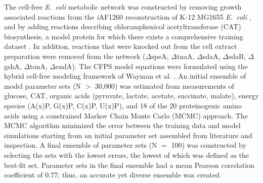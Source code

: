\documentclass[12pt]{article}
\begin{document}
The cell-free \textit{E.~coli} metabolic network was constructed by removing growth associated reactions from the \textit{i}AF1260 reconstruction of K-12 MG1655 \textit{E.~coli} \cite{Feist:2007aa}, and by adding reactions describing chloramphenicol acetyltransferase (CAT) biosynthesis, a model protein for which there exists a comprehensive training dataset \cite{2005_calhoun_BiotechnologyProgress}.
In addition, reactions that were knocked out from the cell extract preparation were removed from the network ($\Delta$speA, $\Delta$tnaA, $\Delta$sdaA, $\Delta$sdaB, $\Delta$gshA, $\Delta$tonA, $\Delta$endA).
The CFPS model equations were formulated using the hybrid cell-free modeling framework of Wayman et al. \cite{pr3010138}.
An initial ensemble of model parameter sets (N $>$ 30,000) was estimated from measurements of glucose, CAT, organic acids (pyruvate, lactate, acetate, succinate, malate), energy species (A(x)P, G(x)P, C(x)P, U(x)P), and 18 of the 20 proteinogenic amino acids using a constrained Markov Chain Monte Carlo (MCMC) approach.
The MCMC algorithm minimized the error between the training data and model simulations starting from an initial parameter set assembled from literature and inspection.
A final ensemble of parameter sets (N $=$ 100) was constructed by selecting the sets with the lowest errors, the lowest of which was defined as the best-fit set.
Parameter sets in the final ensemble had a mean Pearson correlation coefficient of 0.77; thus, an accurate yet diverse ensemble was created.
\end{document}
